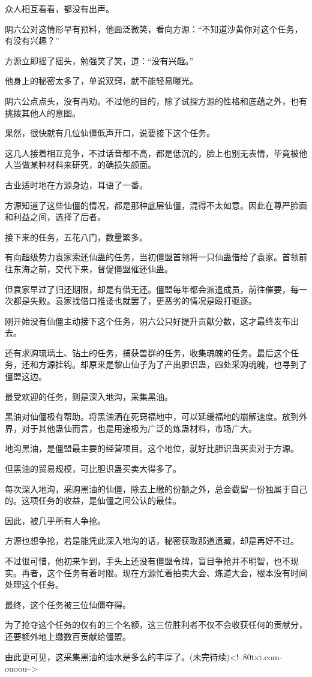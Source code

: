 \begin{this_body}
众人相互看看，都没有出声。

阴六公对这情形早有预料，他面泛微笑，看向方源：“不知道沙黄你对这个任务，有没有兴趣？”

方源立即摇了摇头，勉强笑了笑，道：“没有兴趣。”

他身上的秘密太多了，单说双窍，就不能轻易曝光。

阴六公点点头，没有再劝。不过他的目的，除了试探方源的性格和底蕴之外，也有挑拨其他人的意图。

果然，很快就有几位仙僵低声开口，说要接下这个任务。

这几人接着相互竞争，不过话音都不高，都是低沉的，脸上也别无表情，毕竟被他人当做某种材料来研究，的确损失颜面。

古业适时地在方源身边，耳语了一番。

方源知道了这些仙僵的情况，都是那种底层仙僵，混得不太如意。因此在尊严脸面和利益之间，选择了后者。

接下来的任务，五花八门，数量繁多。

有向超级势力袁家索还仙蛊的任务，当初僵盟首领将一只仙蛊借给了袁家。首领前往东海之前，交代下来，督促僵盟催还仙蛊。

但袁家早过了归还期限，却是有借无还。僵盟每年都会派遣成员，前往催要，每一次都是失败。袁家找借口推诿也就罢了，更恶劣的情况是殴打驱逐。

刚开始没有仙僵主动接下这个任务，阴六公只好提升贡献分数，这才最终发布出去。

还有求购琉璃土、钻土的任务，捕获兽群的任务，收集魂魄的任务。最后这个任务，还和方源挂钩。却原来是黎山仙子为了产出胆识蛊，四处采购魂魄，也寻到了僵盟这边。

最受欢迎的任务，则是深入地沟，采集黑油。

黑油对仙僵极有帮助。将黑油洒在死窍福地中，可以延缓福地的崩解速度。放到外界，对于其他蛊仙而言，也是用途极为广泛的炼蛊材料，市场广大。

地沟黑油，是僵盟最主要的经营项目。这个地位，就好比胆识蛊买卖对于方源。

但黑油的贸易规模，可比胆识蛊买卖大得多了。

每次深入地沟，采购黑油的仙僵，除去上缴的份额之外，总会截留一份独属于自己的。这项任务的收益，是仙僵之间公认的最佳。

因此，被几乎所有人争抢。

方源也想争抢，若是能凭此深入地沟的话，秘密获取那道遗藏，却是再好不过。

不过很可惜，他初来乍到，手头上还没有僵盟令牌，盲目争抢并不明智，也不现实。再者，这个任务有着时限。现在方源忙着拍卖大会、炼道大会，根本没有时间处理这个任务。

最终，这个任务被三位仙僵夺得。

为了抢夺这个任务的仅有的三个名额，这三位胜利者不仅不会收获任何的贡献分，还要额外地上缴数百贡献给僵盟。

由此更可见，这采集黑油的油水是多么的丰厚了。(未完待续)<!--80txt.com-ouoou-->

\end{this_body}

